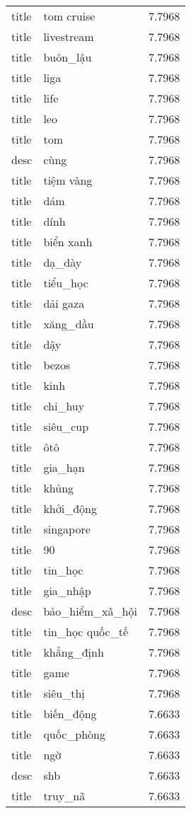 \documentclass{article}
\begin{document}
\begin{tabular}{lll}
title & tom cruise & 7.7968\\
title & livestream & 7.7968\\
title & buôn\_lậu & 7.7968\\
title & liga & 7.7968\\
title & life & 7.7968\\
title & leo & 7.7968\\
title & tom & 7.7968\\
desc & cùng & 7.7968\\
title & tiệm vàng & 7.7968\\
title & dám & 7.7968\\
title & dính & 7.7968\\
title & biển xanh & 7.7968\\
title & dạ\_dày & 7.7968\\
title & tiểu\_học & 7.7968\\
title & dải gaza & 7.7968\\
title & xăng\_dầu & 7.7968\\
title & dậy & 7.7968\\
title & bezos & 7.7968\\
title & kinh & 7.7968\\
title & chỉ\_huy & 7.7968\\
title & siêu\_cup & 7.7968\\
title & ôtô & 7.7968\\
title & gia\_hạn & 7.7968\\
title & khủng & 7.7968\\
title & khởi\_động & 7.7968\\
title & singapore & 7.7968\\
title & 90 & 7.7968\\
title & tin\_học & 7.7968\\
title & gia\_nhập & 7.7968\\
desc & bảo\_hiểm\_xã\_hội & 7.7968\\
title & tin\_học quốc\_tế & 7.7968\\
title & khẳng\_định & 7.7968\\
title & game & 7.7968\\
title & siêu\_thị & 7.7968\\
title & biến\_động & 7.6633\\
title & quốc\_phòng & 7.6633\\
title & ngờ & 7.6633\\
desc & shb & 7.6633\\
title & truy\_nã & 7.6633\\

\end{tabular}
\end{document}
